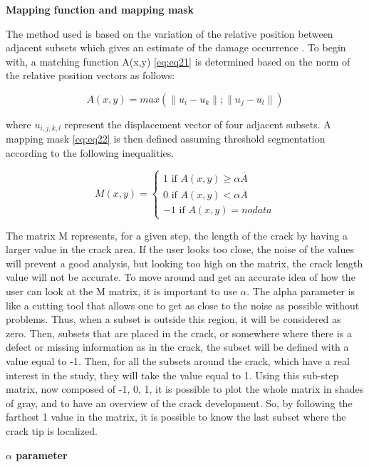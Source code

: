 \textbf{Mapping function and mapping mask}

The method used is based on the variation of the relative position between adjacent subsets which gives an estimate of the damage occurrence \cite{Xavieretal2014}. To begin with, a matching function A(x,y) \ref{eq:eq21} is determined based on the norm of the relative position vectors as follows:

\begin{equation}
	A(x,y)=max(\lVert u_i-u_k\rVert;\lVert u_j-u_l\rVert)
	\label{eq:eq21}
\end{equation}

where $u_{i,j,k,l}$ represent the displacement vector of four adjacent subsets. A mapping mask \ref{eq:eq22} is then defined assuming threshold segmentation according to the following inequalities.

\begin{equation}
	M(x,y)=
	\begin{cases}
		1 \text{ if } A(x,y) \geq \alpha \overline{A} \\
		0 \text{ if } A(x,y)< \alpha \overline{A}\\
		-1 \text{ if } A(x,y)= no data 
	\end{cases}
	\label{eq:eq22}
\end{equation}

The matrix M represents, for a given step, the length of the crack by having a larger value in the crack area. If the user looks too close, the noise of the values will prevent a good analysis, but looking too high on the matrix, the crack length value will not be accurate. To move around and get an accurate idea of how the user can look at the M matrix, it is important to use $\alpha$. The alpha parameter is like a cutting tool that allows one to get as close to the noise as possible without problems. Thus, when a subset is outside this region, it will be considered as zero. Then, subsets that are placed in the crack, or somewhere where there is a defect or missing information as in the crack, the subset will be defined with a value equal to -1. Then, for all the subsets around the crack, which have a real interest in the study, they will take the value equal to 1. Using this sub-step matrix, now composed of -1, 0, 1, it is possible to plot the whole matrix in shades of gray, and to have an overview of the crack development. So, by following the farthest 1 value in the matrix, it is possible to know the last subset where the crack tip is localized.

\textbf{$\alpha$ parameter}

